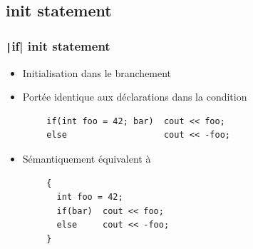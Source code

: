 \documentclass[C++.tex]{subfiles}
\begin{document}
\subsection*{init statement}
\begin{frame}[fragile]
	\frametitle{\texttt|if| init statement}
	\begin{itemize}
		\item Initialisation dans le branchement
		\item Portée identique aux déclarations dans la condition
	\end{itemize}

	\begin{verbatim}
		if(int foo = 42; bar)  cout << foo;
		else                   cout << -foo;
	\end{verbatim}

	\begin{itemize}
		\item Sémantiquement équivalent à
	\end{itemize}

	\begin{verbatim}
		{
		  int foo = 42;
		  if(bar)  cout << foo;
		  else     cout << -foo;
		}
	\end{verbatim}
\end{frame}
\end{document}

